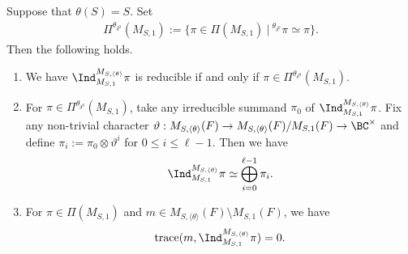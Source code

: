 \documentclass[11pt,letterpaper]{amsart}
\numberwithin{equation}{section}
\begin{document}
\begin{lemma}\label{lem finite index induction restriction}
   Suppose that $\theta(S)=S$.  Set
\begin{align}
\label{eq Pi theta}
    \Pi^{\theta_{\delta^0}}(M_{S,1})
    := 
    \{
    \pi \in \Pi(M_{S,1})\ | \ {}^{\theta_{\delta^0}}\pi \simeq \pi
    \}. 
\end{align}
Then the following holds.
\begin{enumerate}
    \item We have $\Ind_{M_{S,1}}^{M_{S,\langle \theta \rangle}}\pi $ is reducible if and only if $\pi \in \Pi^{\theta_{\delta^0}}(M_{S,1})$.
    \item For $\pi \in \Pi^{\theta_{\delta^0}}(M_{S,1})$, take any irreducible summand $\pi_0$ of $\Ind_{M_{S,1}}^{M_{S,\langle \theta \rangle}}\pi$. Fix any non-trivial character $\vartheta: M_{S,\langle \theta \rangle}(F) \to M_{S,\langle \theta \rangle}(F)/M_{S,1}(F) \to \BC^{\times}$ and define $\pi_i:= \pi_0 \otimes \vartheta^i$ for $0 \leqslant i \leqslant \ell-1$. Then we have 
\begin{align}\label{eq finite index induction}
\Ind_{M_{S,1}}^{M_{S,\langle \theta \rangle}}\pi \simeq \bigoplus_{i=0}^{\ell-1} \pi_i.\end{align}
\item For $\pi \in \Pi(M_{S,1})$ and $m \in M_{S,\langle \theta \rangle}(F) \setminus M_{S,1}(F)$, we have 
\[ \mathrm{trace}( m, \Ind_{M_{S,1}}^{M_{S,\langle \theta \rangle}}\pi )=0.\]
\end{enumerate}

\end{lemma}
\end{document}
